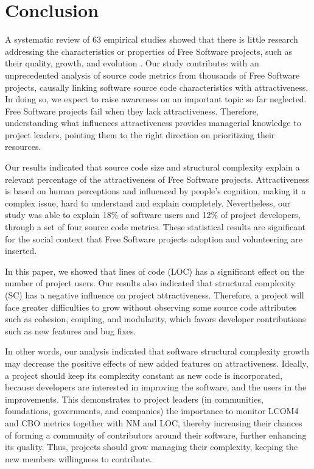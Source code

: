 \documentclass[conference]{IEEEtran}
\begin{document}
\section{Conclusion}
\label{conclusion}

A systematic review of 63 empirical studies showed that there is little research
addressing the characteristics or properties of Free Software projects,
such as their quality, growth, and evolution \cite{Stol2009}.
%
Our study contributes with an unprecedented analysis of
source code metrics from thousands of Free Software projects,
causally linking software source code characteristics with attractiveness.
%
In doing so, we expect to raise awareness on an important topic so far
neglected. Free Software projects fail when they lack attractiveness.
Therefore, understanding what influences attractiveness provides
managerial knowledge to project leaders, pointing them to the right
direction on prioritizing their resources.

Our results indicated that source code size and structural complexity
explain a relevant percentage of the attractiveness of Free Software projects.
%
Attractiveness is based on human perceptions and influenced by people's
cognition, making it a complex issue, hard to understand and explain
completely.
%
Nevertheless, our study was able to explain 18\% of software
users and 12\% of project developers, through a set of four source code metrics.
%
These statistical results are significant for the social context that
Free Software projects adoption and volunteering are inserted.

In this paper, we showed that lines of code (LOC)
has a significant effect on the number of project users.
%
Our results also indicated that structural complexity (SC) has a negative
influence on project attractiveness.
%
Therefore, a project will face greater difficulties to grow without observing
some source code attributes such as cohesion, coupling, and modularity,
which favors developer contributions such as new features and bug fixes.

In other words, our analysis indicated that software structural complexity growth
may decrease the positive effects of new added features on attractiveness.
%
Ideally, a project should keep its complexity constant as new code is incorporated,
because developers are interested in improving the software, and the users in the improvements.
%
This demonstrates to project leaders (in communities, foundations,
governments, and companies)
the importance to monitor LCOM4 and CBO metrics together with NM and LOC,
thereby increasing their chances of forming a community of contributors
around their software, further enhancing its quality.
Thus, projects should grow managing their complexity, keeping the new
members willingness to contribute.
\end{document}
